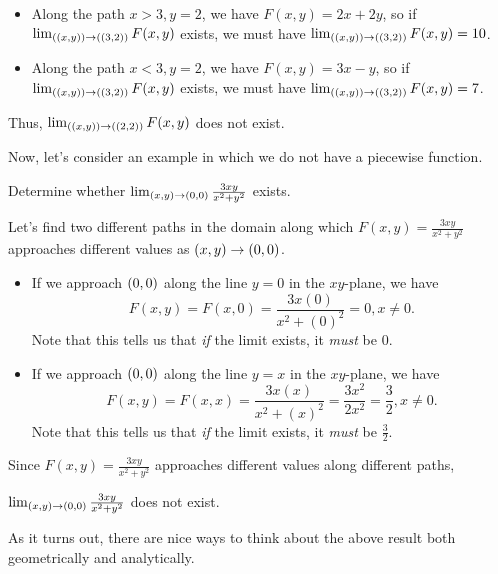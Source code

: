 \documentclass{ximera}
\begin{document}
\begin{example}
\begin{example}
\begin{explanation}
\begin{itemize}
\item Along the path $x>3, y=2$, we have $F(x,y) = 2x+2y$, so if $\lim_{\left(\left(x,y\right)\right) \to \left(\left(3,2\right)\right)} F(x,y)$ exists, we must have $\lim_{\left(\left(x,y\right)\right) \to \left(\left(3,2\right)\right)} F(x,y) = 10$.
\item Along the path $x<3, y=2$, we have $F(x,y) = 3x-y$, so if $\lim_{\left(\left(x,y\right)\right) \to \left(\left(3,2\right)\right)} F(x,y)$ exists, we must have $\lim_{\left(\left(x,y\right)\right) \to \left(\left(3,2\right)\right)} F(x,y) = 7$.
\end{itemize}
Thus, $\lim_{\left(\left(x,y\right)\right) \to \left(\left(2,2\right)\right)} F(x,y)$ does not exist.
\end{explanation}
\end{example}
\end{example}

Now, let's consider an example in which we do not have a piecewise function.

\begin{example}
  Determine whether $\lim_{\left(x,y\right)\to\left(0,0\right)} \frac{3xy}{x^2+y^2}$ exists.
  
  \begin{explanation}
  Let's find two different paths in the domain along which $F(x,y)=\frac{3xy}{x^2+y^2}$ approaches different values as $\left(x,y\right) \to \left(0,0\right)$.
  
  \begin{itemize}
  \item If we approach $\left(0,0\right)$ along the line $y=0$ in the $xy$-plane, we have 
    \[
  F(x,y) = F(x,0) =  \frac{3x(0)}{x^2+(0)^2} = 0, x \neq 0.
  \]
  Note that this tells us that \emph{if} the limit exists, it \emph{must} be $0$.
  
 \item If we approach $\left(0,0\right)$ along the line $y=x$ in the $xy$-plane, we have 
   \[
  F(x,y) = F(x,x) =  \frac{3x(x)}{x^2+(x)^2} = \frac{3x^2}{2x^2} = \frac{3}{2}, x \neq 0.
  \]
  Note that this tells us that \emph{if} the limit exists, it \emph{must} be $\frac{3}{2}$.
  
 \end{itemize}
 
 Since $F(x,y)=\frac{3xy}{x^2+y^2}$ approaches different values along different paths,
 
  $\lim_{\left(x,y\right)\to\left(0,0\right)} \frac{3xy}{x^2+y^2}$ does not exist.
 \end{explanation}
 \end{example}
 
 As it turns out, there are nice ways to think about the above result both geometrically and analytically.
 
\end{document}
